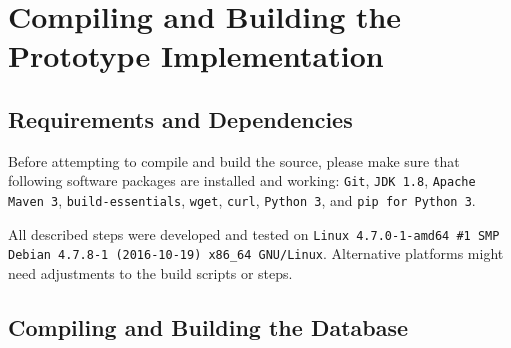 \chapter{Compiling and Building the Prototype Implementation}

\section{Requirements and Dependencies}
Before attempting to compile and build the source, please make sure that following software packages are installed and working: \texttt{Git}, \texttt{JDK 1.8}, \texttt{Apache Maven 3}, \texttt{build-essentials}, \texttt{wget}, \texttt{curl}, \texttt{Python 3}, and \texttt{pip for Python 3}.

All described steps were developed and tested on \texttt{Linux 4.7.0-1-amd64 \#1 SMP Debian 4.7.8-1 (2016-10-19) x86\_64 GNU/Linux}. Alternative platforms might need adjustments to the build scripts or steps.

\section{Compiling and Building the Database}


